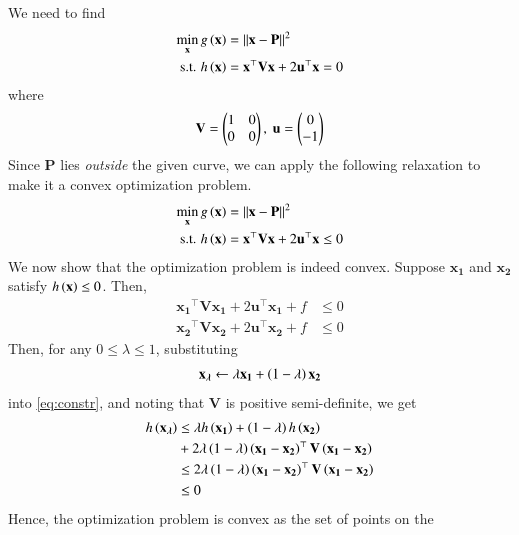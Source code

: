 \documentclass[journal,12pt,twocolumn]{IEEEtran}
\renewcommand{\vec}[1]{\boldsymbol{\mathbf{#1}}}
\begin{document}
\begin{enumerate}
    \solution We need to find
    \begin{align}
        \min_{\vec{x}} g\brak{\vec{x}} &= \norm{\vec{x}-\vec{P}}^2 \\
        \textrm{s.t. } h\brak{\vec{x}} &= \vec{x}^\top\vec{Vx} + 2\vec{u}^\top\vec{x} = 0
    \end{align}
    where
    \begin{align}
        \vec{V} = \myvec{1&0\\0&0},\ \vec{u} = \myvec{0\\-1}
    \end{align}
    Since $\vec{P}$ lies \textit{outside} the given curve, we can apply the following
    relaxation to make it a convex optimization problem.
    \begin{align}
        \min_{\vec{x}} g\brak{\vec{x}} &= \norm{\vec{x}-\vec{P}}^2 \label{eq:cost} \\
        \textrm{s.t. } h\brak{\vec{x}} &= \vec{x}^\top\vec{Vx} + 2\vec{u}^\top\vec{x} \le 0 \label{eq:constr}
    \end{align}
    We now show that the optimization problem is indeed convex. Suppose 
    $\vec{x_1}$ and $\vec{x_2}$ satisfy $h\brak{\vec{x}} \le 0$. Then, 
    \begin{align}
        \vec{x_1}^\top\vec{Vx_1} + 2\vec{u}^\top\vec{x_1} + f &\le 0 \label{eq:x1-parab} \\
        \vec{x_2}^\top\vec{Vx_2} + 2\vec{u}^\top\vec{x_2} + f &\le 0 \label{eq:x2-parab}
    \end{align}
    Then, for any $0 \le \lambda \le 1$, substituting
    \begin{align}
        \vec{x_\lambda} \leftarrow \lambda\vec{x_1} + \brak{1-\lambda}\vec{x_2}
    \end{align}
    into \eqref{eq:constr}, and noting that $\vec{V}$ is positive semi-definite, 
    we get
    \begin{align}
        h\brak{\vec{x_\lambda}} &\le \lambda h\brak{\vec{x_1}} + \brak{1-\lambda}h\brak{\vec{x_2}} \nonumber \\
                                &+ 2\lambda\brak{1-\lambda}\brak{\vec{x_1}-\vec{x_2}}^\top\vec{V}\brak{\vec{x_1}-\vec{x_2}} \\
                                &\le 2\lambda\brak{1-\lambda}\brak{\vec{x_1}-\vec{x_2}}^\top\vec{V}\brak{\vec{x_1}-\vec{x_2}} \\
                                &\le 0
        \label{eq:convex}
    \end{align}
    Hence, the optimization problem is convex as the set of points on the 

\end{enumerate}
\end{document}

